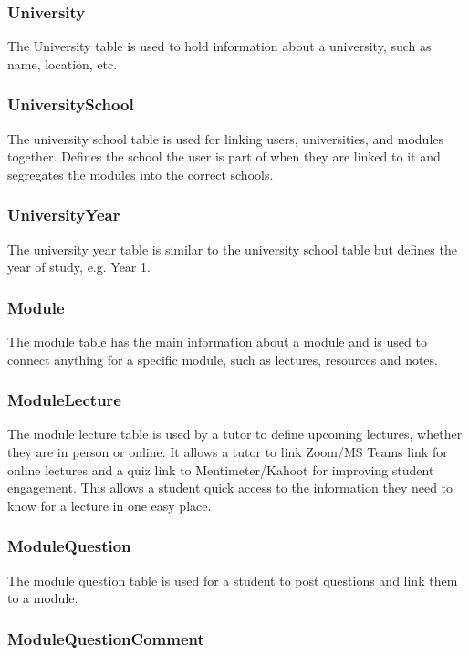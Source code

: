 \subsubsection{University}
The University table is used to hold information about a university, such as name, location, etc.

\subsubsection{UniversitySchool}
The university school table is used for linking users, universities, and modules together. Defines the school the user is part of when they are linked to it and segregates the modules into the correct schools.

\subsubsection{UniversityYear}
The university year table is similar to the university school table but defines the year of study, e.g. Year 1.

\subsubsection{Module}
The module table has the main information about a module and is used to connect anything for a specific module, such as lectures, resources and notes.

\subsubsection{ModuleLecture}
The module lecture table is used by a tutor to define upcoming lectures, whether they are in person or online. It allows a tutor to link Zoom/MS Teams link for online lectures and a quiz link to Mentimeter/Kahoot for improving student engagement. This allows a student quick access to the information they need to know for a lecture in one easy place.

\subsubsection{ModuleQuestion}
The module question table is used for a student to post questions and link them to a module.

\subsubsection{ModuleQuestionComment}

